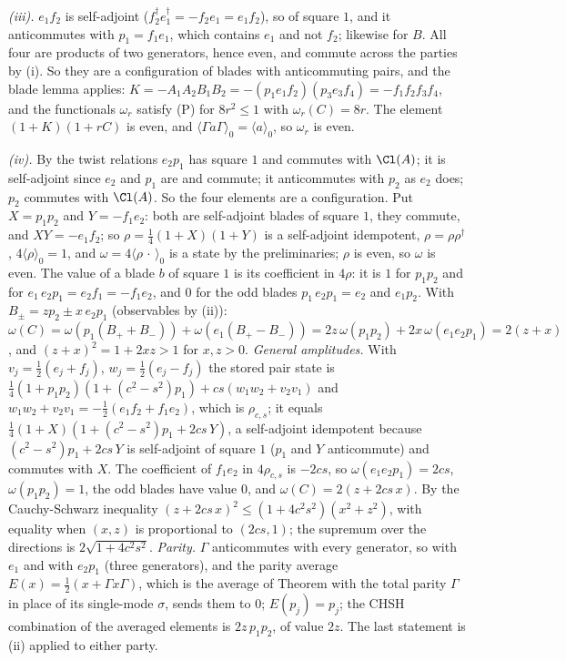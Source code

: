 \emph{(iii).} $e_{1}f_{2}$ is self-adjoint ($f_{2}^{\dagger}e_{1}^{\dagger} = -f_{2}e_{1} = e_{1}f_{2}$), so of square $1$, and it anticommutes with $p_{1} = f_{1}e_{1}$, which contains $e_{1}$ and not $f_{2}$; likewise for $B$. All four are products of two generators, hence even, and commute across the parties by (i). So they are a configuration of blades with anticommuting pairs, and the blade lemma applies: $K = -A_{1}A_{2}B_{1}B_{2} = -(p_{1}e_{1}f_{2})(p_{3}e_{3}f_{4}) = -f_{1}f_{2}f_{3}f_{4}$, and the functionals $\omega_{r}$ satisfy (P) for $8r^{2} \le 1$ with $\omega_{r}(C) = 8r$. The element $(1 + K)(1 + rC)$ is even, and $\langle\Gamma a\Gamma\rangle_{0} = \langle a\rangle_{0}$, so $\omega_{r}$ is even.

\emph{(iv).} By the twist relations $e_{2}p_{1}$ has square $1$ and commutes with $\Cl(A)$; it is self-adjoint since $e_{2}$ and $p_{1}$ are and commute; it anticommutes with $p_{2}$ as $e_{2}$ does; $p_{2}$ commutes with $\Cl(A)$. So the four elements are a configuration. Put $X = p_{1}p_{2}$ and $Y = -f_{1}e_{2}$: both are self-adjoint blades of square $1$, they commute, and $XY = -e_{1}f_{2}$; so $\rho = \tfrac14(1 + X)(1 + Y)$ is a self-adjoint idempotent, $\rho = \rho\rho^{\dagger}$, $4\langle\rho\rangle_{0} = 1$, and $\omega = 4\langle\rho\,\cdot\,\rangle_{0}$ is a state by the preliminaries; $\rho$ is even, so $\omega$ is even. The value of a blade $b$ of square $1$ is its coefficient in $4\rho$: it is $1$ for $p_{1}p_{2}$ and for $e_{1}\,e_{2}p_{1} = e_{2}f_{1} = -f_{1}e_{2}$, and $0$ for the odd blades $p_{1}\,e_{2}p_{1} = e_{2}$ and $e_{1}p_{2}$. With $B_{\pm} = zp_{2} \pm x\,e_{2}p_{1}$ (observables by (ii)): $\omega(C) = \omega(p_{1}(B_{+} + B_{-})) + \omega(e_{1}(B_{+} - B_{-})) = 2z\,\omega(p_{1}p_{2}) + 2x\,\omega(e_{1}e_{2}p_{1}) = 2(z + x)$, and $(z + x)^{2} = 1 + 2xz > 1$ for $x, z > 0$. \emph{General amplitudes.} With $v_{j} = \tfrac12(e_{j} + f_{j})$, $w_{j} = \tfrac12(e_{j} - f_{j})$ the stored pair state is $\tfrac14(1 + p_{1}p_{2})(1 + (c^{2} - s^{2})p_{1}) + cs(w_{1}w_{2} + v_{2}v_{1})$ and $w_{1}w_{2} + v_{2}v_{1} = -\tfrac12(e_{1}f_{2} + f_{1}e_{2})$, which is $\rho_{c,s}$; it equals $\tfrac14(1 + X)(1 + (c^{2} - s^{2})p_{1} + 2cs\,Y)$, a self-adjoint idempotent because $(c^{2} - s^{2})p_{1} + 2cs\,Y$ is self-adjoint of square $1$ ($p_{1}$ and $Y$ anticommute) and commutes with $X$. The coefficient of $f_{1}e_{2}$ in $4\rho_{c,s}$ is $-2cs$, so $\omega(e_{1}e_{2}p_{1}) = 2cs$, $\omega(p_{1}p_{2}) = 1$, the odd blades have value $0$, and $\omega(C) = 2(z + 2cs\,x)$. By the Cauchy-Schwarz inequality $(z + 2cs\,x)^{2} \le (1 + 4c^{2}s^{2})(x^{2} + z^{2})$, with equality when $(x, z)$ is proportional to $(2cs, 1)$; the supremum over the directions is $2\sqrt{1 + 4c^{2}s^{2}}$. \emph{Parity.} $\Gamma$ anticommutes with every generator, so with $e_{1}$ and with $e_{2}p_{1}$ (three generators), and the parity average $E(x) = \tfrac12(x + \Gamma x\Gamma)$, which is the average of Theorem  with the total parity $\Gamma$ in place of its single-mode $\sigma$, sends them to $0$; $E(p_{j}) = p_{j}$; the CHSH combination of the averaged elements is $2z\,p_{1}p_{2}$, of value $2z$. The last statement is (ii) applied to either party.

